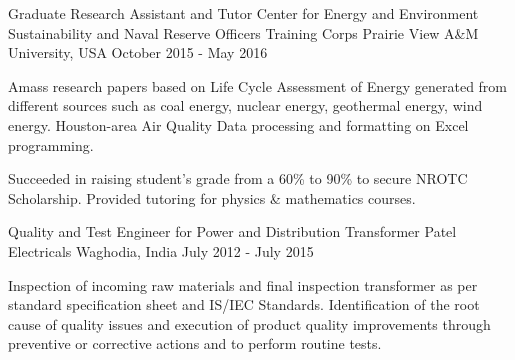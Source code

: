 \begin{cventries}
	\cventry
	{Graduate Research Assistant and Tutor} %
	{Center for Energy and Environment Sustainability and Naval Reserve Officers Training Corps} %
	{Prairie View A\&M University, USA} %
	{October 2015 - May 2016} %
	{ %
		\begin{cvitems}
			\item {Amass research papers based on Life Cycle Assessment of Energy generated from different sources such as coal energy, nuclear energy, geothermal energy, wind energy. Houston-area Air Quality Data processing and formatting on Excel programming.}
			\item {Succeeded in raising student's grade from a 60\% to 90\% to secure NROTC Scholarship. Provided tutoring for physics \& mathematics courses.}
		\end{cvitems}
	}
\end{cventries}
\begin{cventries}
	\cventry
	{Quality and Test Engineer for Power and Distribution Transformer} %
	{Patel Electricals} %
	{Waghodia, India} %
	{July 2012 - July 2015} %
	{ %
		\begin{cvitems}
			\item {Inspection of incoming raw materials and final inspection transformer as per standard specification sheet and IS/IEC Standards. Identification of the root cause of quality issues and execution of product quality improvements through preventive or corrective actions and to perform routine tests.} 
		\end{cvitems}
	}	
\end{cventries}